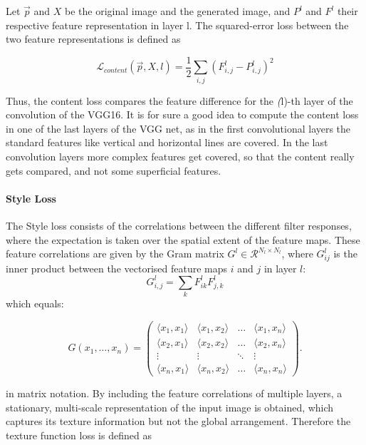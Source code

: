 \documentclass[11pt]{article}
\begin{document}
Let \(\vec{p}\) and \(X\) be the original image and the generated image,
and \(P^l\) and \(F^l\) their respective feature representation in layer
l. The squared-error loss between the two feature representations is
defined as

\begin{equation}
 \mathcal{L}_{content}(\vec{p}, X, l ) = \frac{1}{2} \sum_{i,j}(F^l_{i,j}-P^l_{i,j})^2
\end{equation}

Thus, the content loss compares the feature difference for the
\textit(l)-th layer of the convolution of the VGG16. It is for sure a
good idea to compute the content loss in one of the last layers of the
VGG net, as in the first convolutional layers the standard features like
vertical and horizontal lines are covered. In the last convolution
layers more complex features get covered, so that the content really
gets compared, and not some superficial features.

\paragraph{Style Loss}\label{style-loss}

The Style loss consists of the correlations between the different filter
responses, where the expectation is taken over the spatial extent of the
feature maps. These feature correlations are given by the Gram matrix
\(G^l \in \mathcal{R}^{N_l\times N_l}\), where \(G^l_{ij}\) is the inner
product between the vectorised feature maps \(i\) and \(j\) in layer
\(l\): \[G^l_{i,j}= \sum_k F^l_{ik}F^l_{j,k}\] which equals:

\begin{equation}
G(x_1,\dots, x_n)=\begin{pmatrix} \langle x_1,x_1\rangle & \langle x_1,x_2\rangle &\dots & \langle x_1,x_n\rangle\\
 \langle x_2,x_1\rangle & \langle x_2,x_2\rangle &\dots & \langle x_2,x_n\rangle\\
\vdots&\vdots&\ddots&\vdots\\
 \langle x_n,x_1\rangle & \langle x_n,x_2\rangle &\dots & \langle x_n,x_n\rangle\end{pmatrix}.
\end{equation}

in matrix notation. By including the feature correlations of multiple
layers, a stationary, multi-scale representation of the input image is
obtained, which captures its texture information but not the global
arrangement. Therefore the texture function loss is defined as
\end{document}
